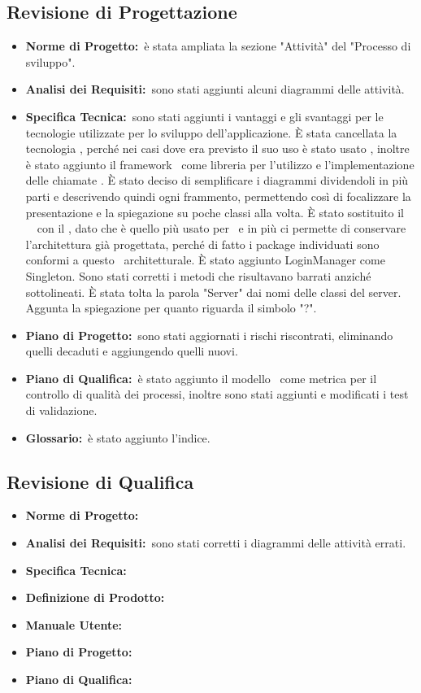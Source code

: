 	\subsection{Revisione di Progettazione}
	\label{revisioneDiProgettazione}
		\begin{itemize}
			\item \textbf{Norme di Progetto:}\ è stata ampliata la sezione "Attività" del "Processo di sviluppo".
			\item \textbf{Analisi dei Requisiti:}\ sono stati aggiunti alcuni diagrammi delle attività.
			\item \textbf{Specifica Tecnica:}\ sono stati aggiunti i vantaggi e gli svantaggi per le tecnologie utilizzate per lo sviluppo dell'applicazione. È stata cancellata la tecnologia , perché nei casi dove era previsto il suo uso è stato usato , inoltre è stato aggiunto il framework \ come libreria per l'utilizzo e l'implementazione delle chiamate . È stato deciso di semplificare i diagrammi dividendoli in più parti e descrivendo quindi ogni frammento, permettendo così di focalizzare la presentazione e la spiegazione su poche classi alla volta. È stato sostituito il \ \ con il , dato che è quello più usato per \ e in più ci permette di conservare l'architettura già progettata, perché di fatto i package individuati sono conformi a questo \ architetturale. È stato aggiunto LoginManager come Singleton. Sono stati corretti i metodi che risultavano barrati anziché sottolineati. È stata tolta la parola "Server" dai nomi delle classi del server. Aggunta la spiegazione per quanto riguarda il simbolo "?".
			\item \textbf{Piano di Progetto:}\ sono stati aggiornati i rischi riscontrati, eliminando quelli decaduti e aggiungendo quelli nuovi.
			\item \textbf{Piano di Qualifica:}\ è stato aggiunto il modello \ come metrica per il controllo di qualità dei processi, inoltre sono stati aggiunti e modificati i test di validazione.
			\item \textbf{Glossario:}\ è stato aggiunto l'indice.
		\end{itemize}
		
	\subsection{Revisione di Qualifica}
	\label{revisioneDiQualifica}
		\begin{itemize}
			\item \textbf{Norme di Progetto:}\
			\item \textbf{Analisi dei Requisiti:}\ sono stati corretti i diagrammi delle attività errati.
			\item \textbf{Specifica Tecnica:}\
			\item \textbf{Definizione di Prodotto:}\
			\item \textbf{Manuale Utente:}\
			\item \textbf{Piano di Progetto:}\
			\item \textbf{Piano di Qualifica:}\
		\end{itemize}